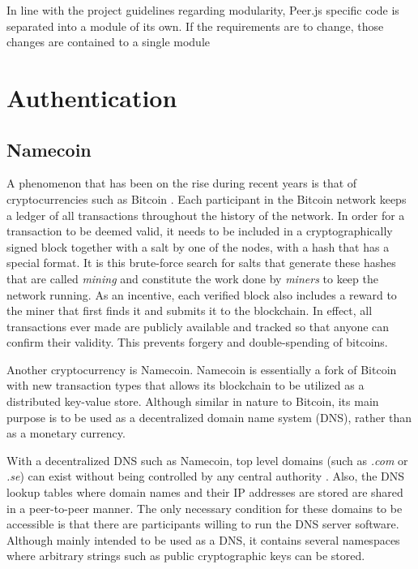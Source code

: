In line with the project guidelines regarding modularity, Peer.js specific code is separated into a module of its own. If the requirements are to change, those changes are contained to a single module 


\section{Authentication}

\subsection{Namecoin}
A phenomenon that has been on the rise during recent years is that of cryptocurrencies such as Bitcoin \cite{CryptoCoinInsider:2014:Online}. Each participant in the Bitcoin network keeps a ledger of all transactions throughout the history of the network. In order for a transaction to be deemed valid, it needs to be included in a cryptographically signed block together with a salt by one of the nodes, with a hash that has a special format. It is this brute-force search for salts that generate these hashes that are called \emph{mining} and constitute the work done by \emph{miners} to keep the network running. As an incentive, each verified block also includes a reward to the miner that first finds it and submits it to the blockchain\cite{InternetForBeginners:2014:Online}. In effect, all transactions ever made are publicly available and tracked so that anyone can confirm their validity. This prevents forgery and double-spending of bitcoins.

Another cryptocurrency is Namecoin\cite{CryptoCoinInsider:2014:Online}. Namecoin is essentially a fork of Bitcoin with new transaction types that allows its blockchain to be utilized as a distributed key-value store. Although similar in nature to Bitcoin, its main purpose is to be used as a decentralized domain name system (DNS), rather than as a monetary currency.

With a decentralized DNS such as Namecoin, top level domains (such as \emph{.com} or \emph{.se}) can exist without being controlled by any central authority \cite{CryptoCoinInsider:2014:Online}. Also, the DNS lookup tables where domain names and their IP addresses are stored are shared in a peer-to-peer manner. The only necessary condition for these domains to be accessible is that there are participants willing to run the DNS server software. Although mainly intended to be used as a DNS, it contains several namespaces where arbitrary strings such as public cryptographic keys can be stored.

